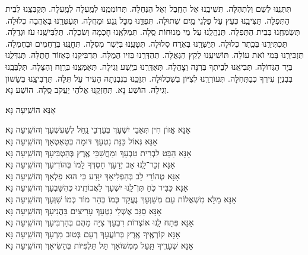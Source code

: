 \documentclass[twoside, openany, parskip=half, 11pt]{book}
\begin{document}
תִּתְּנֵֽנוּ לְשֵׁם וְלִתְהִלָּה. תְּשִׁיבֵֽנוּ אֶל הַחֶֽבֶל וְאֶל הַנַּחֲלָה. תְּרוֹמְמֵֽנוּ לְמַֽעְלָה לְמָֽעְלָה. תְּקַבְּצֵֽנוּ לְבֵית הַתְּפִלָּה. תַּצִּיבֵֽנוּ כְּעֵץ עַל פַּלְגֵי מַֽיִם שְׁתוּלָה. תִּפְדֵּֽנוּ מִכׇּל נֶֽגַע וּמַחֲלָה. תְּעַטְּרֵֽנוּ בְּאַהֲבָה כְלוּלָה. תְּשַׂמְּחֵֽנוּ בְּבֵית הַתְּפִלָּה. תְּנַהֲלֵֽנוּ עַל מֵי מְנוּחוֹת סֶֽלָה. תְּמַלְּאֵֽנוּ חׇכְמָה וְשִׂכְלָה. תַּלְבִּישֵֽׁנוּ עֹז וּגְדֻלָּה. תַּכְתִּירֵֽנוּ בְּכֶֽתֶר כְּלוּלָה. תְּיַשְּׁרֵֽנוּ בְּאֹֽרַח סְלוּלָה. תִּטָּעֵֽנוּ בְּיֹֽשֶׁר מְסִלָּה. תְּחׇנֵּֽנוּ בְּרַחֲמִים וּבְחֶמְלָה. תַּזְכִּירֵֽנוּ בְּמִי זֹאת עוֹלָה. תּוֹשִׁיעֵֽנוּ לְקֵץ הַגְּאֻלָּה. תְּהַדְּרֵֽנוּ בְּזִיו הֲמֻלָּה. תַּדְבִּיקֵֽנוּ כְּאֵזוֹר חֲתֻלָּה. תְּגַדְּלֵֽנוּ בְּיָד הַגְּדוֹלָה. תְּבִיאֵֽנוּ לְבֵיתְךָ בְּרִנָּה וְצׇהֳלָה. תְּאַדְּרֵֽנוּ בְּיֶֽשַׁע וְגִילָה. תְּאַמְּצֵֽנוּ בְּרֶֽוַח וְהַצָּלָה. תְּלַבְּבֵֽנוּ בְּבִנְיַן עִירְךָ כְּבַתְּחִלָּה. תְּעוֹרְרֵֽנוּ לְצִיּוֹן בְשִׁכְלוּלָהּ. תְּזַכֵּֽנוּ בְּנִבְנְתָה הָעִיר עַל תִּלָּהּ. תַּרְבִּיצֵֽנוּ בְּשָׂשׁוֹן וְגִילָה. הוֹשַׁע נָא. תְּחַזְקֵֽנוּ אֱלֹהֵי יַעֲקֹב סֶֽלָה. הוֹשַׁע נָא. 

\begin{large}אָנָּא הוֹשִֽׁיעָה נָּא׃\end{large}

\begin{small}
	אָנָּא אֱזוֹן חִין תְּאֵבֵי יִשְׁעָךְ בְּעַרְבֵי נַֽחַל לְשַׁעְשְׁעָךְ \hfill וְהוֹשִֽׁיעָה נָּא׃\\
	אָנָּא גְּאוֹל כַּנַּת נִטְעָךְ דּוּמָה בְּטַאְטְאָךְ \hfill וְהוֹשִֽׁיעָה נָּא׃\\
	אָנָּא הַבֵּט לִבְרִית טִבְעָךְ וּמַחֲשַׁכֵּי אֶֽרֶץ בְּהַטְבִּיעָךְ \hfill וְהוֹשִֽׁיעָה נָּא׃\\
	אָנָּא זְכָר־לָֽנוּ אָב יְדָעָךְ חַסְדְּךָ לָֽמוֹ בְּהוֹדִיעָךְ \hfill וְהוֹשִֽׁיעָה נָּא׃\\
	אָנָּא טְהוֹרֵי לֵב בְּהַפְלִיאָךְ יִוָּדַע כִּי הוּא פִלְאָךְ \hfill וְהוֹשִֽׁיעָה נָּא׃\\
	אָנָּא כַּבִּיר כֹּֽחַ תֶּן־לָֽנוּ יִשְׁעָךְ לַאֲבוֹתֵֽינוּ כְּהִשָּׁבְעָךְ \hfill וְהוֹשִֽׁיעָה נָּא׃\\
	אָנָּא מַלֵּא מִשְׁאֲלוֹת עַם מְשַׁוְּעָךְ נֶעֱקָד כְּמוֹ בְּהַר מוֹר כְּמוֹ שִׁוְּעָךְ \hfill וְהוֹשִֽׁיעָה נָּא׃\\
	אָנָּא סַגֵּב אֶשְׁלֵי נִטְעָךְ עָרִיצִים בַּהֲנִיעָךְ \hfill וְהוֹשִֽׁיעָה נָּא׃\\
	אָנָּא פְּתַח לָֽנוּ אוֹצְרוֹת רִבְעָךְ צִיָּה מֵהֶם בְּהַרְבִּיעָךְ \hfill וְהוֹשִֽׁיעָה נָּא׃\\
	אָנָּא קוֹרְאֶֽיךָ אֶֽרֶץ בְּרוֹעֲעָךְ רְעֵם בְּטוּב מִרְעָךְ \hfill וְהוֹשִֽׁיעָה נָּא׃\\
	אָנָּא שְׁעָרֶֽיךָ תַּֽעַל מִמְּשׁוֹאָךְ תֵּל תַּלְפִּיּוֹת בְּהַשִּׂיאָךְ \hfill וְהוֹשִֽׁיעָה נָּא׃
	
\end{small}
\end{document}
